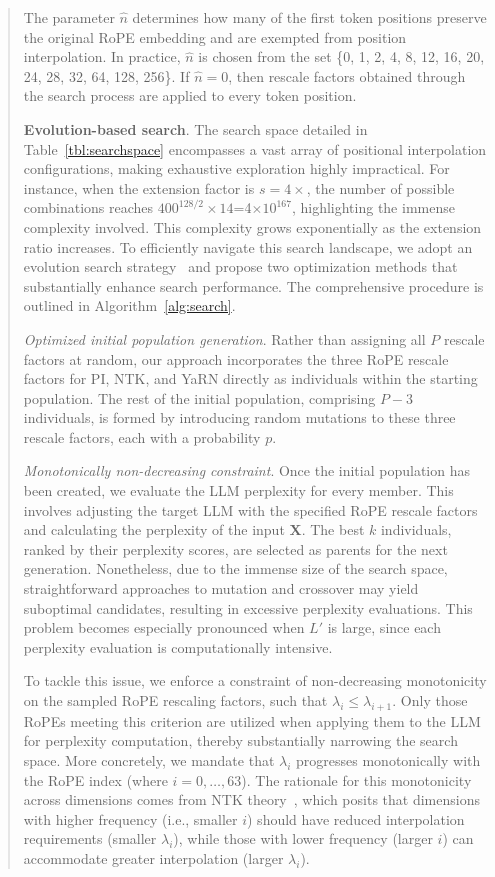 \begin{abstract}
The parameter $\hat{n}$ determines how many of the first token positions preserve the original RoPE embedding and are exempted from position interpolation. In practice, $\hat{n}$ is chosen from the set \{0, 1, 2, 4, 8, 12, 16, 20, 24, 28, 32, 64, 128, 256\}. If $\hat{n}=0$, then rescale factors obtained through the search process are applied to every token position.

\textbf{Evolution-based search}. The search space detailed in Table~\ref{tbl:searchspace} encompasses a vast array of positional interpolation configurations, making exhaustive exploration highly impractical. For instance, when the extension factor is $s=4\times$, the number of possible combinations reaches $400^{128/2}\times14$=4$\times10^{167}$, highlighting the immense complexity involved. This complexity grows exponentially as the extension ratio increases. To efficiently navigate this search landscape, we adopt an evolution search strategy~\cite{guo2020single} and propose two optimization methods that substantially enhance search performance. The comprehensive procedure is outlined in Algorithm~\ref{alg:search}.

\textit{Optimized initial population generation}. Rather than assigning all $P$ rescale factors at random, our approach incorporates the three RoPE rescale factors for PI, NTK, and YaRN directly as individuals within the starting population. The rest of the initial population, comprising $P-3$ individuals, is formed by introducing random mutations to these three rescale factors, each with a probability $p$.

\textit{Monotonically non-decreasing constraint}. Once the initial population has been created, we evaluate the LLM perplexity for every member. This involves adjusting the target LLM with the specified RoPE rescale factors and calculating the perplexity of the input $\mathbf{X}$. The best $k$ individuals, ranked by their perplexity scores, are selected as parents for the next generation. Nonetheless, due to the immense size of the search space, straightforward approaches to mutation and crossover may yield suboptimal candidates, resulting in excessive perplexity evaluations. This problem becomes especially pronounced when $L'$ is large, since each perplexity evaluation is computationally intensive.

To tackle this issue, we enforce a constraint of non-decreasing monotonicity on the sampled RoPE rescaling factors, such that $\lambda_i\le \lambda_{i+1}$. Only those RoPEs meeting this criterion are utilized when applying them to the LLM for perplexity computation, thereby substantially narrowing the search space. More concretely, we mandate that $\lambda_i$ progresses monotonically with the RoPE index (where $i=0,\ldots,63$). The rationale for this monotonicity across dimensions comes from NTK theory~\cite{jacot2018neural,tancik2020fourier,ntk}, which posits that dimensions with higher frequency (i.e., smaller $i$) should have reduced interpolation requirements (smaller $\lambda_i$), while those with lower frequency (larger $i$) can accommodate greater interpolation (larger $\lambda_i$).


\end{abstract}
